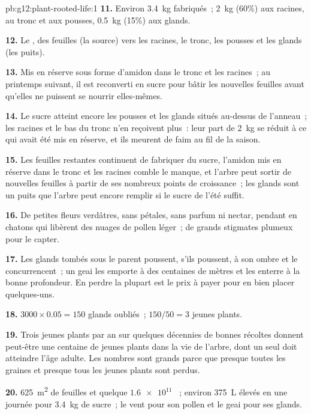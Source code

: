 \begin{solution}{pb:g12:plant-rooted-life:1}
\textbf{11.} Environ \qty{3.4}{kg} fabriqués~; \qty{2}{kg} (60\%) aux
racines, au tronc et aux pousses, \qty{0.5}{kg} (15\%) aux glands.

\textbf{12.} Le , des feuilles (la source) vers les racines, le
tronc, les pousses et les glands (les puits).

\textbf{13.} Mis en réserve sous forme d'amidon dans le tronc et les
racines~; au printemps suivant, il est reconverti en sucre pour bâtir
les nouvelles feuilles avant qu'elles ne puissent se nourrir
elles-mêmes.

\textbf{14.} Le sucre atteint encore les pousses et les glands situés
au-dessus de l'anneau~; les racines et le bas du tronc n'en reçoivent
plus~: leur part de \qty{2}{kg} se réduit à ce qui avait été mis en
réserve, et ils meurent de faim au fil de la saison.

\textbf{15.} Les feuilles restantes continuent de fabriquer du sucre,
l'amidon mis en réserve dans le tronc et les racines comble le manque,
et l'arbre peut sortir de nouvelles feuilles à partir de ses nombreux
points de croissance~; les glands sont un puits que l'arbre peut
encore remplir si le sucre de l'été suffit.

\textbf{16.} De petites fleurs verdâtres, sans pétales, sans parfum ni
nectar, pendant en chatons qui libèrent des nuages de pollen léger~;
de grands stigmates plumeux pour le capter.

\textbf{17.} Les glands tombés sous le parent poussent, s'ils
poussent, à son ombre et le concurrencent~; un geai les emporte à des
centaines de mètres et les enterre à la bonne profondeur. En perdre la
plupart est le prix à payer pour en bien placer quelques-uns.

\textbf{18.} $3000 \times 0.05 = 150$ glands oubliés~; $150/50 = 3$
jeunes plants.

\textbf{19.} Trois jeunes plants par an sur quelques décennies de
bonnes récoltes donnent peut-être une centaine de jeunes plants dans
la vie de l'arbre, dont un seul doit atteindre l'âge adulte. Les
nombres sont grands parce que presque toutes les graines et presque
tous les jeunes plants sont perdus.

\textbf{20.} \qty{625}{m^2} de feuilles et quelque $\num{1.6e11}$
~; environ \qty{375}{L} élevés en une journée pour
\qty{3.4}{kg} de sucre~; le vent pour son pollen et le geai pour ses
glands.
\end{solution}
